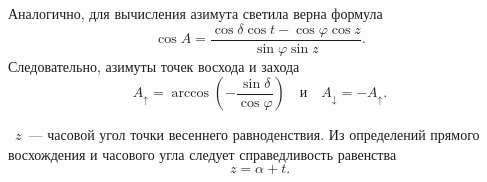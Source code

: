Аналогично, для вычисления азимута светила верна формула
\begin{equation}
	\cos A=\frac{\cos\delta\cos t-\cos\varphi\cos z}{\sin\varphi\sin z}.
\end{equation}
Следовательно, азимуты точек восхода и захода
\begin{equation}
	A_\uparrow = \arccos \left(-\dfrac{\sin\delta}{\cos \varphi} \right)\quad\text{и}\quad A_\downarrow = - A_\uparrow.
\end{equation}

~$z$~--- часовой угол точки весеннего равноденствия. Из определений прямого восхождения и часового угла следует справедливость равенства\begin{equation}
z = \alpha + t.
\end{equation}
